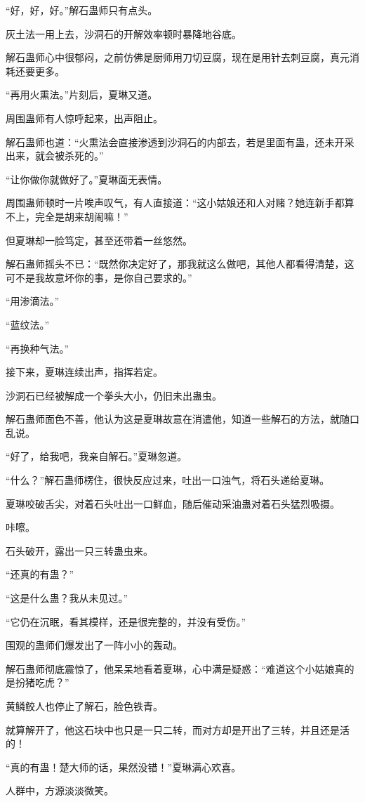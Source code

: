 \begin{this_body}
“好，好，好。”解石蛊师只有点头。

灰土法一用上去，沙洞石的开解效率顿时暴降地谷底。

解石蛊师心中很郁闷，之前仿佛是厨师用刀切豆腐，现在是用针去刺豆腐，真元消耗还要更多。

“再用火熏法。”片刻后，夏琳又道。

周围蛊师有人惊呼起来，出声阻止。

解石蛊师也道：“火熏法会直接渗透到沙洞石的内部去，若是里面有蛊，还未开采出来，就会被杀死的。”

“让你做你就做好了。”夏琳面无表情。

周围蛊师顿时一片唉声叹气，有人直接道：“这小姑娘还和人对赌？她连新手都算不上，完全是胡来胡闹嘛！”

但夏琳却一脸笃定，甚至还带着一丝悠然。

解石蛊师摇头不已：“既然你决定好了，那我就这么做吧，其他人都看得清楚，这可不是我故意坏你的事，是你自己要求的。”

“用渗滴法。”

“蓝纹法。”

“再换种气法。”

接下来，夏琳连续出声，指挥若定。

沙洞石已经被解成一个拳头大小，仍旧未出蛊虫。

解石蛊师面色不善，他认为这是夏琳故意在消遣他，知道一些解石的方法，就随口乱说。

“好了，给我吧，我亲自解石。”夏琳忽道。

“什么？”解石蛊师楞住，很快反应过来，吐出一口浊气，将石头递给夏琳。

夏琳咬破舌尖，对着石头吐出一口鲜血，随后催动采油蛊对着石头猛烈吸摄。

咔嚓。

石头破开，露出一只三转蛊虫来。

“还真的有蛊？”

“这是什么蛊？我从未见过。”

“它仍在沉眠，看其模样，还是很完整的，并没有受伤。”

围观的蛊师们爆发出了一阵小小的轰动。

解石蛊师彻底震惊了，他呆呆地看着夏琳，心中满是疑惑：“难道这个小姑娘真的是扮猪吃虎？”

黄鳞鲛人也停止了解石，脸色铁青。

就算解开了，他这石块中也只是一只二转，而对方却是开出了三转，并且还是活的！

“真的有蛊！楚大师的话，果然没错！”夏琳满心欢喜。

人群中，方源淡淡微笑。


\end{this_body}
